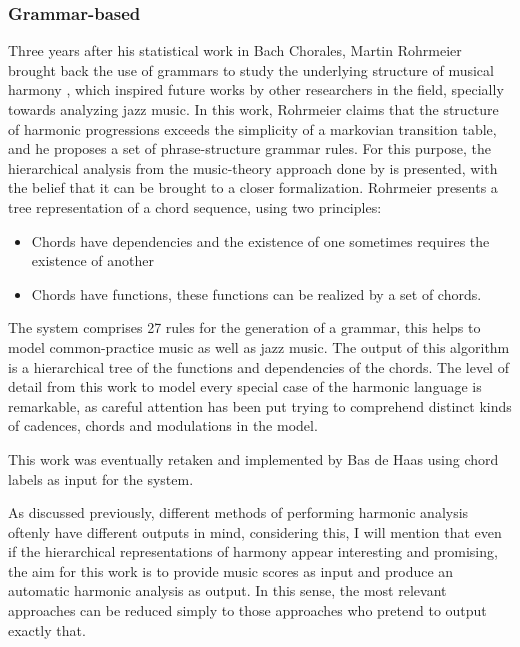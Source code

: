     \subsubsection{Grammar-based}
    Three years after his statistical work in Bach Chorales, Martin Rohrmeier brought back the use of grammars to study the underlying structure of musical harmony \cite{rohrmeier2011towards}, which inspired future works by other researchers in the field, specially towards analyzing jazz music. In this work, Rohrmeier claims that the structure of harmonic progressions exceeds the simplicity of a markovian transition table, and he proposes a set of phrase-structure grammar rules. For this purpose, the hierarchical analysis from the music-theory approach done by \cite{kostka1995tonal} is presented, with the belief that it can be brought to a closer formalization. Rohrmeier presents a tree representation of a chord sequence, using two principles:
    \begin{itemize}
			\item Chords have dependencies and the existence of one sometimes requires the existence of another
			\item Chords have functions, these functions can be realized by a set of chords.
		\end{itemize}
    The system comprises 27 rules for the generation of a grammar, this helps to model common-practice music as well as jazz music. The output of this algorithm is a hierarchical tree of the functions and dependencies of the chords. The level of detail from this work to model every special case of the harmonic language is remarkable, as careful attention has been put trying to comprehend distinct kinds of cadences, chords and modulations in the model.

    This work was eventually retaken and implemented by Bas de Haas \cite{de2013automatic} using chord labels as input for the system.

    As discussed previously, different methods of performing harmonic analysis oftenly have different outputs in mind, considering this, I will mention that even if the hierarchical representations of harmony appear interesting and promising, the aim for this work is to provide music scores as input and produce an automatic harmonic analysis as output. In this sense, the most relevant approaches can be reduced simply to those approaches who pretend to output exactly that.


